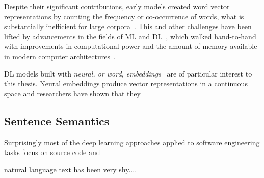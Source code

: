 



Despite their significant contributions, early models created word vector representations
by counting the frequency or co-occurrence of words, what is substantially inefficient for large corpora~\cite{Ye2016}.
This and other challenges have been lifted by advancements in the fields of \acf{ML} and \acf{DL}~\cite{ferreira2021, li2018deep}, which walked hand-to-hand with improvements in computational power and the amount of memory available in modern computer architectures~\cite{sharafi2015}.


\acs{DL} models built with \textit{neural, or word, embeddings}~\cite{Mikolov2013} 
are of particular interest to this thesis. 
Neural embeddings produce vector representations in a continuous space 
and researchers have shown that they 














\subsection{Sentence Semantics}







Surprisingly 
most of the deep learning approaches applied to software engineering tasks 
focus on source code and 

natural language text has been very shy....




